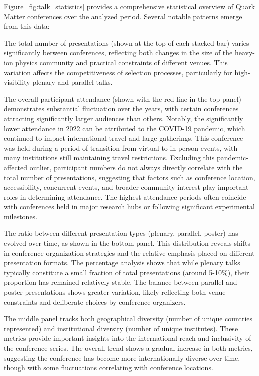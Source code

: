 \documentclass[a4paper,11pt]{article}
\begin{document}
Figure~\ref{fig:talk_statistics} provides a comprehensive statistical overview of Quark Matter conferences over the analyzed period. Several notable patterns emerge from this data:

The total number of presentations (shown at the top of each stacked bar) varies significantly between conferences, reflecting both changes in the size of the heavy-ion physics community and practical constraints of different venues. This variation affects the competitiveness of selection processes, particularly for high-visibility plenary and parallel talks.

The overall participant attendance (shown with the red line in the top panel) demonstrates substantial fluctuation over the years, with certain conferences attracting significantly larger audiences than others. Notably, the significantly lower attendance in 2022 can be attributed to the COVID-19 pandemic, which continued to impact international travel and large gatherings. This conference was held during a period of transition from virtual to in-person events, with many institutions still maintaining travel restrictions. Excluding this pandemic-affected outlier, participant numbers do not always directly correlate with the total number of presentations, suggesting that factors such as conference location, accessibility, concurrent events, and broader community interest play important roles in determining attendance. The highest attendance periods often coincide with conferences held in major research hubs or following significant experimental milestones.

The ratio between different presentation types (plenary, parallel, poster) has evolved over time, as shown in the bottom panel. This distribution reveals shifts in conference organization strategies and the relative emphasis placed on different presentation formats. The percentage analysis shows that while plenary talks typically constitute a small fraction of total presentations (around 5-10\%), their proportion has remained relatively stable. The balance between parallel and poster presentations shows greater variation, likely reflecting both venue constraints and deliberate choices by conference organizers.

The middle panel tracks both geographical diversity (number of unique countries represented) and institutional diversity (number of unique institutes). These metrics provide important insights into the international reach and inclusivity of the conference series. The overall trend shows a gradual increase in both metrics, suggesting the conference has become more internationally diverse over time, though with some fluctuations correlating with conference locations.
\end{document}
